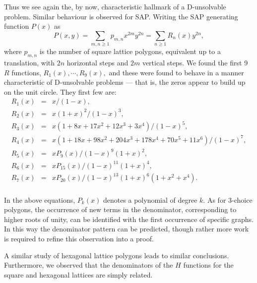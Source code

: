 Thus we see again the, by now, characteristic hallmark of a
D-unsolvable problem.  
Similar behaviour is observed for SAP.
 Writing the SAP generating function
 $P(x)$ as
 $$P(x,y) = \sum_{m,n\ge 1} p_{m,n}x^{2m}y^{2n} = \sum_{n\ge 1} R_n(x)y^{2n}, $$
 where $p_{m,n}$ is the number of square lattice polygons, equivalent
 up to a translation, with $2n$ horizontal steps and $2m$ vertical
 steps.
 We \cite{EG98}  found the first 9 $R$ functions, $R_1(x), \cdots , R_{9}(x),$
 and these were found to behave in a manner characteristic of D-unsolvable
 problems --- that is, the zeros appear to build up on the unit
 circle.
  They first few  are:
  \begin{eqnarray*}
  R_1(x)& =&  x/(1 - x),\\
  R_2(x)& =& x(1 + x)^2/(1 - x)^3,\\ 
  R_3(x)& =& x(1 + 8x + 17x^2 + 12x^3 + 3x^4)/(1 - x)^5,\\
  R_4(x)& =& x(1 + 18x + 98x^2 + 204x^3 + 178x^4 + 70x^5 + 11x^6)/(1 - x)^7,\\
  R_5(x)& =& xP_9(x)/(1 - x)^9(1 + x)^2,\\
  R_6(x)& =& xP_{15}(x)/(1 - x)^{11}(1 + x)^4,\\
  R_7(x)& =& xP_{20}(x)/(1 - x)^{13}(1 + x)^6(1 + x^2 + x^4).\\
  \end{eqnarray*}

In the above equations, $P_k(x)$ denotes a polynomial of degree $k.$
As for 3-choice polygons,
the occurrence of new terms in the denominator,
corresponding to higher roots of unity, can be identified
with the first occurrence of specific graphs. 
In this way \cite{BMP98} the denominator pattern can be predicted,
though rather more work is required to refine this observation into
a proof.

A similar study of hexagonal lattice polygons \cite{EG98} leads to
similar conclusions. Furthermore, we observed that
the denominators of the $H$ functions
for the square and hexagonal lattices are simply related.

